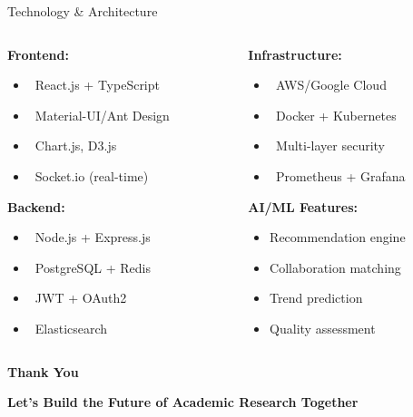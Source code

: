 \documentclass[aspectratio=169]{beamer}
\begin{document}
\begin{frame}{Technology & Architecture}
\begin{columns}
\begin{column}{0.5\textwidth}
\textbf{Frontend:}
\begin{itemize}
\item \faReact\ React.js + TypeScript
\item \faPalette\ Material-UI/Ant Design
\item \faChartBar\ Chart.js, D3.js
\item \faComments\ Socket.io (real-time)
\end{itemize}

\textbf{Backend:}
\begin{itemize}
\item \faNodeJs\ Node.js + Express.js
\item \faDatabase\ PostgreSQL + Redis
\item \faKey\ JWT + OAuth2
\item \faSearch\ Elasticsearch
\end{itemize}
\end{column}
\begin{column}{0.5\textwidth}
\textbf{Infrastructure:}
\begin{itemize}
\item \faCloud\ AWS/Google Cloud
\item \faDocker\ Docker + Kubernetes
\item \faShieldAlt\ Multi-layer security
\item \faChartLine\ Prometheus + Grafana
\end{itemize}

\textbf{AI/ML Features:}
\begin{itemize}
\item Recommendation engine
\item Collaboration matching
\item Trend prediction
\item Quality assessment
\end{itemize}
\end{column}
\end{columns}
\end{frame}


\begin{frame}
\begin{center}
{\Huge \textbf{Thank You}}

\vspace{1cm}
\textcolor{narmpblue}{\faHandsHelping} \textcolor{narmporange}{\faLightbulb} \textcolor{narmpgreen}{\faRocket}

\vspace{1cm}
\textbf{Let's Build the Future of Academic Research Together}
\end{center}
\end{frame}
\end{document}

